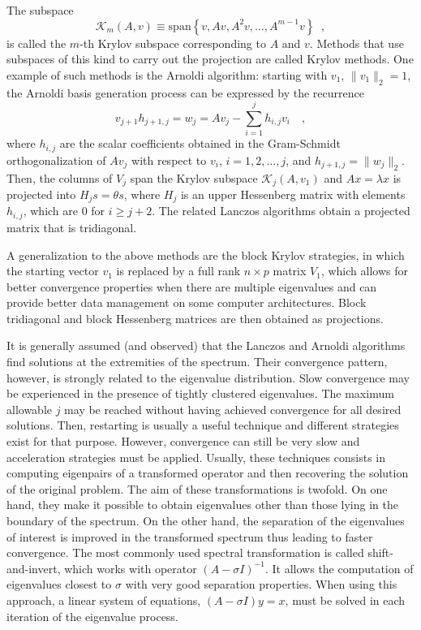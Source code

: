 	The subspace
\begin{equation}
\mathcal{K}_m(A,v)\equiv\mathrm{span}\left\{v,Av,A^2v,\ldots,A^{m-1}v\right\}\;\;,\label{eq:krylov}
\end{equation}
is called the $m$-th Krylov subspace corresponding to $A$ and $v$. Methods that use subspaces of this kind to carry out the projection are called Krylov methods. One example of such methods is the Arnoldi algorithm: starting with $v_1$, $\|v_1\|_2=1$, the Arnoldi basis generation process can be expressed by the recurrence
\begin{equation}
v_{j+1}h_{j+1,j}=w_j=Av_j-\sum_{i=1}^jh_{i,j}v_i\quad,
\end{equation}
where $h_{i,j}$ are the scalar coefficients obtained in the Gram-Schmidt orthogonalization of $Av_j$ with respect to $v_i$, $i=1,2,\ldots,j$, and $h_{j+1,j}=\|w_j\|_2$. Then, the columns of $V_j$ span the Krylov subspace $\mathcal{K}_j(A,v_1)$ and $Ax=\lambda x$ is projected into $H_js=\theta s$, where $H_j$ is an upper Hessenberg matrix with elements $h_{i,j}$, which are 0 for $i\geq j+2$. The related Lanczos algorithms obtain a projected matrix that is tridiagonal.

	A generalization to the above methods are the block Krylov strategies, in which the starting vector $v_1$ is replaced by a full rank $n\times p$ matrix $V_1$, which allows for better convergence properties when there are multiple eigenvalues and can provide better data management on some computer architectures. Block tridiagonal and block Hessenberg matrices are then obtained as projections.

	It is generally assumed (and observed) that the Lanczos and Arnoldi algorithms find solutions at the extremities of the spectrum. Their convergence pattern, however, is strongly related to the eigenvalue distribution. Slow convergence may be experienced in the presence of tightly clustered eigenvalues. The maximum allowable $j$ may be reached without having achieved convergence for all desired solutions. Then, restarting is usually a useful technique and different strategies exist for that purpose. However, convergence can still be very slow and acceleration strategies must be applied. Usually, these techniques consists in computing eigenpairs of a transformed operator and then recovering the solution of the original problem. The aim of these transformations is twofold. On one hand, they make it possible to obtain eigenvalues other than those lying in the boundary of the spectrum. On the other hand, the separation of the eigenvalues of interest is improved in the transformed spectrum thus leading to faster convergence. The most commonly used spectral transformation is called shift-and-invert, which works with operator $(A-\sigma I)^{-1}$. It allows the computation of eigenvalues closest to $\sigma$ with very good separation properties. When using this approach, a linear system of equations, $(A-\sigma I)y=x$, must be solved in each iteration of the eigenvalue process.

